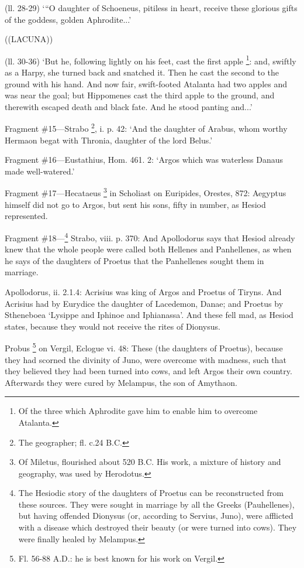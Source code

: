 (ll. 28-29) ‘“O daughter of Schoeneus, pitiless in heart, receive
these glorious gifts of the goddess, golden Aphrodite...’

((LACUNA))

(ll. 30-36) ‘But he, following lightly on his feet, cast the first apple
\footnote{Of the three which
Aphrodite gave him to enable him to overcome Atalanta.}: and, swiftly as a Harpy, she
turned back and snatched it. Then he cast the second to the ground with his
hand. And now fair, swift-footed Atalanta had two apples and was near the goal;
but Hippomenes cast the third apple to the ground, and therewith escaped death
and black fate. And he stood panting and...’

Fragment \#15—Strabo \footnote{The geographer; fl. c.24
B.C.}, i. p. 42: ‘And the
daughter of Arabus, whom worthy Hermaon begat with Thronia, daughter of the
lord Belus.’

Fragment \#16—Eustathius, Hom. 461. 2: ‘Argos which was waterless
Danaus made well-watered.’

Fragment \#17—Hecataeus \footnote{Of Miletus, flourished
about 520 B.C. His work, a mixture of history and geography, was used by
Herodotus.} in Scholiast on Euripides,
Orestes, 872: Aegyptus himself did not go to Argos, but sent his sons, fifty in
number, as Hesiod represented.

Fragment \#18—\footnote{The Hesiodic story of the
daughters of Proetus can be reconstructed from these sources. They were sought
in marriage by all the Greeks (Pauhellenes), but having offended Dionysus (or,
according to Servius, Juno), were afflicted with a disease which destroyed
their beauty (or were turned into cows). They were finally healed by Melampus.} Strabo, viii. p. 370: And
Apollodorus says that Hesiod already knew that the whole people were called
both Hellenes and Panhellenes, as when he says of the daughters of Proetus that
the Panhellenes sought them in marriage.

Apollodorus, ii. 2.1.4: Acrisius was king of Argos and Proetus of Tiryns. And
Acrisius had by Eurydice the daughter of Lacedemon, Danae; and Proetus by
Stheneboea ‘Lysippe and Iphinoe and Iphianassa’. And these fell
mad, as Hesiod states, because they would not receive the rites of Dionysus.

Probus \footnote{Fl. 56-88 A.D.: he is best
known for his work on Vergil.} on Vergil, Eclogue vi. 48: These
(the daughters of Proetus), because they had scorned the divinity of Juno, were
overcome with madness, such that they believed they had been turned into cows,
and left Argos their own country. Afterwards they were cured by Melampus, the
son of Amythaon.

